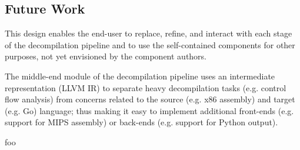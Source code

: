 
\subsection{Future Work}

This design enables the end-user to replace, refine, and interact with each stage of the decompilation pipeline and to use the self-contained components for other purposes, not yet envisioned by the component authors.

The middle-end module of the decompilation pipeline uses an intermediate representation (LLVM IR) to separate heavy decompilation tasks (e.g. control flow analysis) from concerns related to the source (e.g. x86 assembly) and target (e.g. Go) language; thus making it easy to implement additional front-ends (e.g. support for MIPS assembly) or back-ends (e.g. support for Python output).











foo
